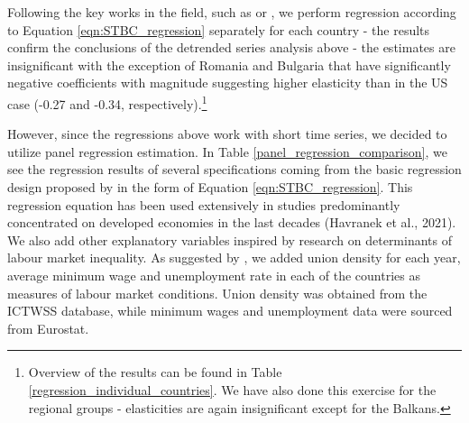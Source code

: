 \documentclass[11pt]{article}
\begin{document}
Following the key works in the field, such as \citet{katz1992changes} or \citet{acemoglu2012does}, we perform regression according to Equation \ref{eqn:STBC_regression} separately for each country - the results confirm the conclusions of the detrended series analysis above - the estimates are insignificant with the exception of Romania and Bulgaria that have significantly negative coefficients with magnitude suggesting higher elasticity than in the US case (-0.27 and -0.34, respectively).\footnote{Overview of the results can be found in Table \ref{regression_individual_countries}. We have also done this exercise for the regional groups - elasticities are again insignificant except for the Balkans.}

However, since the regressions above work with short time series, we decided to utilize panel regression estimation. In Table \ref{panel_regression_comparison}, we see the regression results of several specifications coming from the basic regression design proposed by \citet{katz1992changes} in the form of Equation \ref{eqn:STBC_regression}. This regression equation has been used extensively in studies predominantly concentrated on developed economies in the last decades (Havranek et al., 2021). We also add other explanatory variables inspired by research on determinants of labour market inequality. As suggested by \citet{farber2021unions}, we added union density for each year, average minimum wage and unemployment rate in each of the countries as measures of labour market conditions. Union density was obtained from the ICTWSS database, while minimum wages and unemployment data were sourced from Eurostat. %
\end{document}
